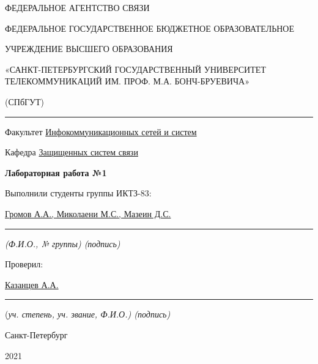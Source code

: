 \documentclass[a4paper,14pt]{extarticle}
\begin{document}
    \begin{center}
        \thispagestyle{empty}
        \begin{singlespace}
        ФЕДЕРАЛЬНОЕ АГЕНТСТВО СВЯЗИ

        ФЕДЕРАЛЬНОЕ ГОСУДАРСТВЕННОЕ БЮДЖЕТНОЕ ОБРАЗОВАТЕЛЬНОЕ

        УЧРЕЖДЕНИЕ ВЫСШЕГО ОБРАЗОВАНИЯ

        «САНКТ-ПЕТЕРБУРГСКИЙ ГОСУДАРСТВЕННЫЙ УНИВЕРСИТЕТ ТЕЛЕКОММУНИКАЦИЙ ИМ. ПРОФ. М.А. БОНЧ-БРУЕВИЧА»

        (СПбГУТ)
        \end{singlespace}
        \vspace{-1ex}
        \rule{\textwidth}{0.4pt}
        \vspace{-5ex}

        Факультет \underline{Инфокоммуникационных сетей и систем}

        Кафедра \underline{Защищенных систем связи}
        \vspace{10ex}

        \textbf{Лабораторная работа №1}\\
        


    \end{center}
    \vspace{4ex}
    \begin{flushright}
    \parbox{10 cm}{
    \begin{flushleft}
        Выполнили студенты группы ИКТЗ-83:

        \underline{Громов А.А., Миколаени М.С., Мазеин Д.С.} \hfill \rule[-0.85ex]{0.1\textwidth}{0.6pt}

        \footnotesize \textit{ (Ф.И.О., № группы) \hfill (подпись)} \normalsize

        Проверил:

        \underline{Казанцев А.А.} \hfill \rule[-0.85ex]{0.1\textwidth}{0.6pt}

        (\footnotesize \textit{уч. степень, уч. звание, Ф.И.О.) \hfill (подпись)} \normalsize

    \end{flushleft}
    }
    \end{flushright}
    \begin{center}
        \vfill
        Санкт-Петербург

        2021

    \end{center}
    \newpage
\end{document}
